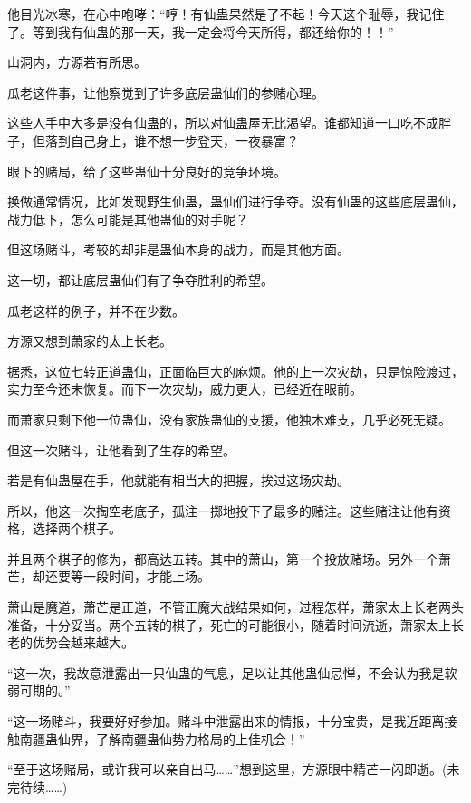 \begin{this_body}
他目光冰寒，在心中咆哮：“哼！有仙蛊果然是了不起！今天这个耻辱，我记住了。等到我有仙蛊的那一天，我一定会将今天所得，都还给你的！！”

山洞内，方源若有所思。

瓜老这件事，让他察觉到了许多底层蛊仙们的参赌心理。

这些人手中大多是没有仙蛊的，所以对仙蛊屋无比渴望。谁都知道一口吃不成胖子，但落到自己身上，谁不想一步登天，一夜暴富？

眼下的赌局，给了这些蛊仙十分良好的竞争环境。

换做通常情况，比如发现野生仙蛊，蛊仙们进行争夺。没有仙蛊的这些底层蛊仙，战力低下，怎么可能是其他蛊仙的对手呢？

但这场赌斗，考较的却非是蛊仙本身的战力，而是其他方面。

这一切，都让底层蛊仙们有了争夺胜利的希望。

瓜老这样的例子，并不在少数。

方源又想到萧家的太上长老。

据悉，这位七转正道蛊仙，正面临巨大的麻烦。他的上一次灾劫，只是惊险渡过，实力至今还未恢复。而下一次灾劫，威力更大，已经近在眼前。

而萧家只剩下他一位蛊仙，没有家族蛊仙的支援，他独木难支，几乎必死无疑。

但这一次赌斗，让他看到了生存的希望。

若是有仙蛊屋在手，他就能有相当大的把握，挨过这场灾劫。

所以，他这一次掏空老底子，孤注一掷地投下了最多的赌注。这些赌注让他有资格，选择两个棋子。

并且两个棋子的修为，都高达五转。其中的萧山，第一个投放赌场。另外一个萧芒，却还要等一段时间，才能上场。

萧山是魔道，萧芒是正道，不管正魔大战结果如何，过程怎样，萧家太上长老两头准备，十分妥当。两个五转的棋子，死亡的可能很小，随着时间流逝，萧家太上长老的优势会越来越大。

“这一次，我故意泄露出一只仙蛊的气息，足以让其他蛊仙忌惮，不会认为我是软弱可期的。”

“这一场赌斗，我要好好参加。赌斗中泄露出来的情报，十分宝贵，是我近距离接触南疆蛊仙界，了解南疆蛊仙势力格局的上佳机会！”

“至于这场赌局，或许我可以亲自出马……”想到这里，方源眼中精芒一闪即逝。(未完待续……)

\end{this_body}

